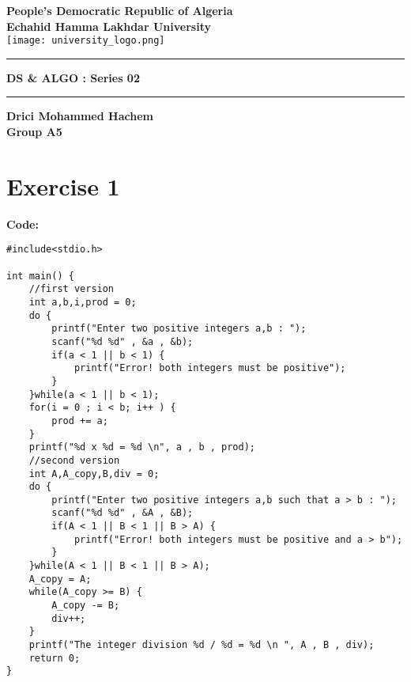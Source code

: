\documentclass[12pt]{article}
\begin{document}
	
	\begin{titlepage}
		\centering
		\vspace*{2cm}
		
		\textbf{\Large People's Democratic Republic of Algeria}\\
		\vspace{0.5cm}
		\textbf{\large Echahid Hamma Lakhdar University}\\
		
		\vspace{1cm}
		\texttt{[image: university\_logo.png]} %
		
		\vspace{1.5cm}
		\rule{\textwidth}{1pt}
		\vspace{0.5cm}
		
		\textbf{\Large DS \& ALGO : Series 02}\\
		\vspace{0.5cm}
		\rule{\textwidth}{1pt}
		\vspace{0.5cm}
		
		\vspace{1.5cm}
		\textbf{\Huge Drici Mohammed Hachem}\\
		\vspace{0.5cm}
		\textbf{\Large Group A5}\\
		
		\vfill
	\end{titlepage}
	
	\newpage
	\section*{Exercise 1}
	 \vspace{0.5cm}
	 
	 \textbf{Code:} 
\begin{lstlisting}
#include<stdio.h>

int main() {
	//first version
	int a,b,i,prod = 0;
	do {
		printf("Enter two positive integers a,b : ");
		scanf("%d %d" , &a , &b);
		if(a < 1 || b < 1) {
			printf("Error! both integers must be positive");
		}
	}while(a < 1 || b < 1);
	for(i = 0 ; i < b; i++ ) {
		prod += a;
	}
	printf("%d x %d = %d \n", a , b , prod);
	//second version
	int A,A_copy,B,div = 0;
	do {
		printf("Enter two positive integers a,b such that a > b : ");
		scanf("%d %d" , &A , &B);
		if(A < 1 || B < 1 || B > A) {
			printf("Error! both integers must be positive and a > b");
		}
	}while(A < 1 || B < 1 || B > A);
	A_copy = A;
	while(A_copy >= B) {
		A_copy -= B;
		div++;
	}
	printf("The integer division %d / %d = %d \n ", A , B , div);
	return 0;
}
		 
\end{lstlisting}
\vspace{1cm}
	
\end{document}
